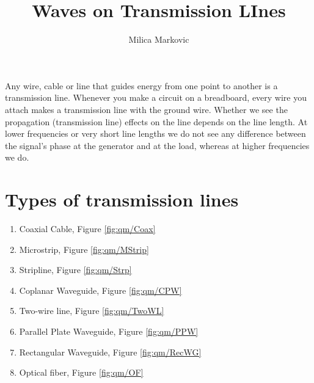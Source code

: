 \documentclass{ximera}
\title{Waves on Transmission LInes}
\author{Milica Markovic}
\begin{document}
  
\begin{abstract}  

\end{abstract}  
\maketitle    






Any wire, cable or line that guides energy from one point to another
is a transmission line. Whenever you make a circuit on a breadboard,
every wire you attach makes  a transmission line with the ground wire. Whether we see the propagation (transmission line) effects on the
line depends on the line length. 
At lower frequencies or very short line lengths we do not
see any difference between the signal's phase at the generator and at the load,
whereas at higher frequencies we do.








\section{Types of transmission lines}

\begin{enumerate}
\item Coaxial Cable, Figure \ref{fig:qm/Coax}
\item Microstrip, Figure \ref{fig:qm/MStrip}
\item Stripline, Figure \ref{fig:qm/Strp}
\item Coplanar Waveguide, Figure \ref{fig:qm/CPW}
\item Two-wire line, Figure \ref{fig:qm/TwoWL}
\item Parallel Plate Waveguide, Figure \ref{fig:qm/PPW}
\item Rectangular Waveguide, Figure \ref{fig:qm/RecWG}
\item Optical fiber, Figure \ref{fig:qm/OF}
\end{enumerate}
\end{document}
